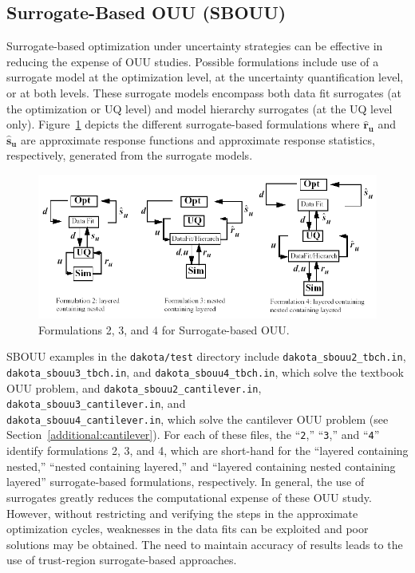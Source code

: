 \subsection{Surrogate-Based OUU (SBOUU)}\label{adv_models:ouu:sb}

Surrogate-based optimization under uncertainty strategies can be
effective in reducing the expense of OUU studies. Possible
formulations include use of a surrogate model at the optimization
level, at the uncertainty quantification level, or at both levels.
These surrogate models encompass both data fit surrogates (at the
optimization or UQ level) and model hierarchy surrogates (at the UQ
level only). Figure~\ref{adv_models:figure10} depicts the different
surrogate-based formulations where $\mathbf{\hat{r}_{u}}$ and
$\mathbf{\hat{s}_{u}}$ are approximate response functions and
approximate response statistics, respectively, generated from the
surrogate models.

\begin{figure}
  \centering
  \includegraphics[scale=0.65]{images/sbouu}
  \caption{Formulations 2, 3, and 4 for Surrogate-based OUU.}
  \label{adv_models:figure10}
\end{figure}

SBOUU examples in the \texttt{dakota/test} directory include
\texttt{dakota\_sbouu2\_tbch.in},\\ \texttt{dakota\_sbouu3\_tbch.in},
and \texttt{dakota\_sbouu4\_tbch.in}, which solve the textbook OUU
problem, and \texttt{dakota\_sbouu2\_cantilever.in},
\texttt{dakota\_sbouu3\_cantilever.in}, and\\
\texttt{dakota\_sbouu4\_cantilever.in}, which solve the cantilever OUU
problem (see Section~\ref{additional:cantilever}). For each of these
files, the ``\texttt{2},'' ``\texttt{3},'' and ``\texttt{4}'' identify
formulations 2, 3, and 4, which are short-hand for the ``layered
containing nested,'' ``nested containing layered,'' and ``layered
containing nested containing layered'' surrogate-based formulations,
respectively. In general, the use of surrogates greatly reduces the
computational expense of these OUU study. However, without restricting
and verifying the steps in the approximate optimization cycles,
weaknesses in the data fits can be exploited and poor solutions may be
obtained. The need to maintain accuracy of results leads to the use of
trust-region surrogate-based approaches.

